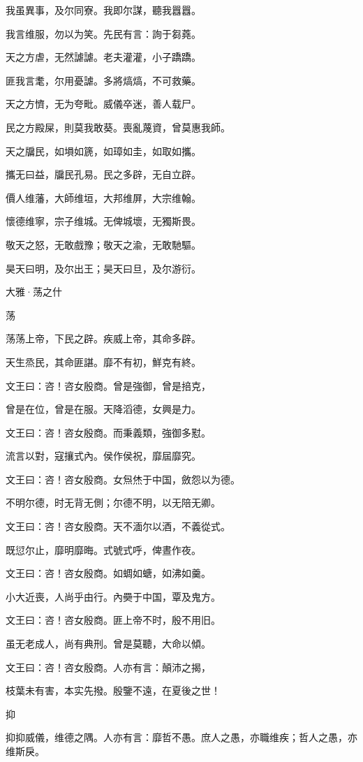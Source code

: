 我虽異事，及尔同寮。我即尔謀，聽我囂囂。

我言维服，勿以为笑。先民有言：詢于芻蕘。

天之方虐，无然謔謔。老夫灌灌，小子蹻蹻。

匪我言耄，尔用憂謔。多將熇熇，不可救藥。

天之方懠，无为夸毗。威儀卒迷，善人载尸。

民之方殿屎，則莫我敢葵。喪亂蔑資，曾莫惠我師。

天之牖民，如塤如篪，如璋如圭，如取如攜。

攜无曰益，牖民孔易。民之多辟，无自立辟。

價人维藩，大師维垣，大邦维屏，大宗维翰。

懷德维寧，宗子维城。无俾城壞，无獨斯畏。

敬天之怒，无敢戲豫；敬天之渝，无敢馳驅。

昊天曰明，及尔出王；昊天曰旦，及尔游衍。




大雅·荡之什


荡

荡荡上帝，下民之辟。疾威上帝，其命多辟。

天生烝民，其命匪諶。靡不有初，鮮克有終。

文王曰：咨！咨女殷商。曾是強御，曾是掊克，

曾是在位，曾是在服。天降滔德，女興是力。

文王曰：咨！咨女殷商。而秉義類，強御多懟。

流言以對，寇攘式內。侯作侯祝，靡屆靡究。

文王曰：咨！咨女殷商。女炰烋于中国，斂怨以为德。

不明尔德，时无背无側；尔德不明，以无陪无卿。

文王曰：咨！咨女殷商。天不湎尔以酒，不義從式。

既愆尔止，靡明靡晦。式號式呼，俾晝作夜。

文王曰：咨！咨女殷商。如蜩如螗，如沸如羹。

小大近喪，人尚乎由行。內奰于中国，覃及鬼方。

文王曰：咨！咨女殷商。匪上帝不时，殷不用旧。

虽无老成人，尚有典刑。曾是莫聽，大命以傾。

文王曰：咨！咨女殷商。人亦有言：顛沛之揭，

枝葉未有害，本实先撥。殷鑒不遠，在夏後之世！

抑

抑抑威儀，维德之隅。人亦有言：靡哲不愚。庶人之愚，亦職维疾；哲人之愚，亦维斯戾。

